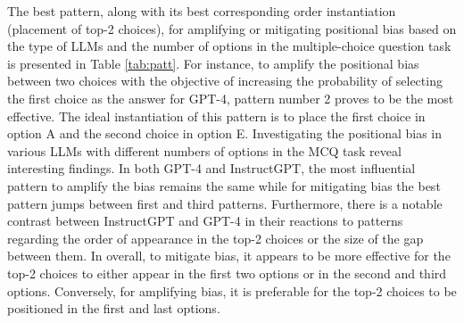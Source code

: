 \documentclass[11pt]{article}
\begin{document}


The best pattern, along with its best corresponding order instantiation (placement of top-2 choices), for amplifying or mitigating positional bias based on the type of LLMs and the number of options in the multiple-choice question task is presented in Table \ref{tab:patt}. 
For instance, to amplify the positional bias between two choices with the objective of increasing the probability of selecting the first choice as the answer for GPT-4, pattern number 2 proves to be the most effective. 
The ideal instantiation of this pattern is to place the first choice in option A and the second choice in option E.
Investigating the positional bias in various LLMs with different numbers of options in the MCQ task reveal interesting findings. In both GPT-4 and InstructGPT, the most influential pattern to amplify the bias remains the same while for mitigating bias the best pattern jumps between first and third patterns. 
Furthermore, there is a notable contrast between InstructGPT and GPT-4 in their reactions to patterns regarding the order of appearance in the top-2 choices or the size of the gap between them.  
In overall, to mitigate bias, it appears to be more effective for the top-2 choices to either appear in the first two options or in the second and third options. Conversely, for amplifying bias, it is preferable for the top-2 choices to be positioned in the first and last options. 
\end{document}
